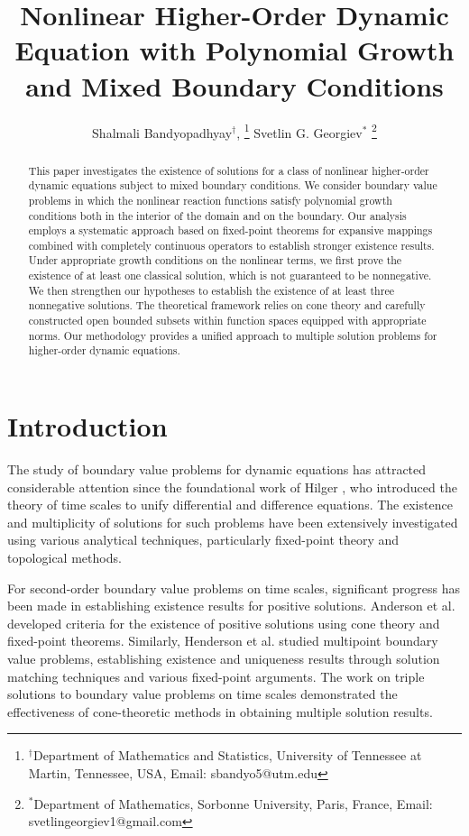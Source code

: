 \documentclass[reqno, 12pt]{amsart}
\title{ Nonlinear Higher-Order Dynamic Equation with Polynomial Growth and Mixed Boundary Conditions }
\author{ Shalmali Bandyopadhyay$^\dagger$, \protect\footnote{$^\dagger$Department of Mathematics and Statistics, University of Tennessee at Martin, Tennessee, USA, Email: sbandyo5@utm.edu} Svetlin G. Georgiev$^*$ \protect\footnote{$^*$Department of Mathematics, Sorbonne University, Paris, France, Email: svetlingeorgiev1@gmail.com}}
\date{}
\numberwithin{equation}{section}
\begin{document}
\begin{abstract}
This paper investigates the existence of solutions for a class of nonlinear higher-order dynamic equations subject to mixed boundary conditions. We consider boundary value problems in which the nonlinear reaction functions satisfy polynomial growth conditions both in the interior of the domain and on the boundary. Our analysis employs a systematic approach based on fixed-point theorems for expansive mappings combined with completely continuous operators to establish stronger existence results. Under appropriate growth conditions on the nonlinear terms, we first prove the existence of at least one classical solution, which is not guaranteed to be nonnegative. We then strengthen our hypotheses to establish the existence of at least three nonnegative solutions. The theoretical framework relies on cone theory and carefully constructed open bounded subsets within function spaces equipped with appropriate norms. Our methodology provides a unified approach to multiple solution problems for higher-order dynamic equations.
\end{abstract}

\maketitle

\section{Introduction}


The study of boundary value problems for dynamic equations has attracted considerable attention since the foundational work of Hilger \cite{H}, who introduced the theory of time scales to unify differential and difference equations. The existence and multiplicity of solutions for such problems have been extensively investigated using various analytical techniques, particularly fixed-point theory and topological methods.

For second-order boundary value problems on time scales, significant progress has been made in establishing existence results for positive solutions. Anderson et al. \cite{A1,A2} developed criteria for the existence of positive solutions using cone theory and fixed-point theorems. Similarly, Henderson et al. \cite{H1,H2} studied multipoint boundary value problems, establishing existence and uniqueness results through solution matching techniques and various fixed-point arguments. The work on triple solutions to boundary value problems on time scales \cite{MT} demonstrated the effectiveness of cone-theoretic methods in obtaining multiple solution results.
\end{document}
